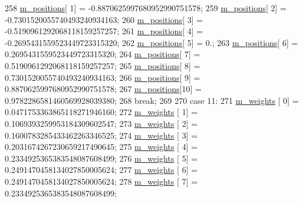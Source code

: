 \begin{DoxyCode}
258       \hyperlink{class_q_u_e_s_o_1_1_base1_d_quadrature_aeda387c028c3ba89ea0f9637a2234212}{m\_positions}[ 1] = -0.8870625997680952990751578;
259       \hyperlink{class_q_u_e_s_o_1_1_base1_d_quadrature_aeda387c028c3ba89ea0f9637a2234212}{m\_positions}[ 2] = -0.7301520055740493240934163;
260       \hyperlink{class_q_u_e_s_o_1_1_base1_d_quadrature_aeda387c028c3ba89ea0f9637a2234212}{m\_positions}[ 3] = -0.5190961292068118159257257;
261       \hyperlink{class_q_u_e_s_o_1_1_base1_d_quadrature_aeda387c028c3ba89ea0f9637a2234212}{m\_positions}[ 4] = -0.2695431559523449723315320;
262       \hyperlink{class_q_u_e_s_o_1_1_base1_d_quadrature_aeda387c028c3ba89ea0f9637a2234212}{m\_positions}[ 5] =  0.;
263       \hyperlink{class_q_u_e_s_o_1_1_base1_d_quadrature_aeda387c028c3ba89ea0f9637a2234212}{m\_positions}[ 6] =  0.2695431559523449723315320;
264       \hyperlink{class_q_u_e_s_o_1_1_base1_d_quadrature_aeda387c028c3ba89ea0f9637a2234212}{m\_positions}[ 7] =  0.5190961292068118159257257;
265       \hyperlink{class_q_u_e_s_o_1_1_base1_d_quadrature_aeda387c028c3ba89ea0f9637a2234212}{m\_positions}[ 8] =  0.7301520055740493240934163;
266       \hyperlink{class_q_u_e_s_o_1_1_base1_d_quadrature_aeda387c028c3ba89ea0f9637a2234212}{m\_positions}[ 9] =  0.8870625997680952990751578;
267       \hyperlink{class_q_u_e_s_o_1_1_base1_d_quadrature_aeda387c028c3ba89ea0f9637a2234212}{m\_positions}[10] =  0.9782286581460569928039380;
268     \textcolor{keywordflow}{break};
269 
270     \textcolor{keywordflow}{case} 11:
271       \hyperlink{class_q_u_e_s_o_1_1_base1_d_quadrature_a7117fec020a8098d1c22b604268bad93}{m\_weights}  [ 0] =  0.0471753363865118271946160;
272       \hyperlink{class_q_u_e_s_o_1_1_base1_d_quadrature_a7117fec020a8098d1c22b604268bad93}{m\_weights}  [ 1] =  0.1069393259953184309602547;
273       \hyperlink{class_q_u_e_s_o_1_1_base1_d_quadrature_a7117fec020a8098d1c22b604268bad93}{m\_weights}  [ 2] =  0.1600783285433462263346525;
274       \hyperlink{class_q_u_e_s_o_1_1_base1_d_quadrature_a7117fec020a8098d1c22b604268bad93}{m\_weights}  [ 3] =  0.2031674267230659217490645;
275       \hyperlink{class_q_u_e_s_o_1_1_base1_d_quadrature_a7117fec020a8098d1c22b604268bad93}{m\_weights}  [ 4] =  0.2334925365383548087608499;
276       \hyperlink{class_q_u_e_s_o_1_1_base1_d_quadrature_a7117fec020a8098d1c22b604268bad93}{m\_weights}  [ 5] =  0.2491470458134027850005624;
277       \hyperlink{class_q_u_e_s_o_1_1_base1_d_quadrature_a7117fec020a8098d1c22b604268bad93}{m\_weights}  [ 6] =  0.2491470458134027850005624;
278       \hyperlink{class_q_u_e_s_o_1_1_base1_d_quadrature_a7117fec020a8098d1c22b604268bad93}{m\_weights}  [ 7] =  0.2334925365383548087608499;

\end{DoxyCode}
